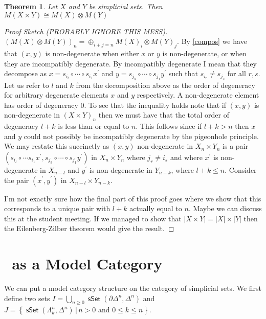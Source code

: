 \documentclass{amsart}
\newcommand{\catname}[1]{{\sffamily\upshape{{#1}}}}
\newcommand{\sset}{\catname{sSet}}
\DeclareMathOperator{\msset}{\mathsf{sSet}}
\newtheorem{theorem}{Theorem}[subsection]
\theoremstyle{definition}
\begin{document}
\begin{theorem}
  Let $X$ and $Y$ be simplicial sets. Then
  $M(X\times Y)\cong M(X)\otimes M(Y)$
\end{theorem}
\begin{proof}[Proof Sketch (PROBABLY IGNORE THIS MESS)]
  $\left(M(X)\otimes M(Y)\right)_n = \oplus_{i+j=n} M(X)_i \otimes M(Y)_j$.
  By \ref{compos} we have that $(x,y)$ is non-degenerate when either $x$ or
  $y$ is non-degenerate, or when they are incompatibly degenerate. By incompatibly
  degenerate I mean that they decompose as
  $x=s_{i_l}\circ\cdots \circ s_{i_1} x^\prime$ and
  $y=s_{j_k}\circ \cdots \circ s_{j_1} y^\prime$ such that $s_{i_r}\neq s_{j_s}$
  for all $r,s$. Let us refer to $l$ and $k$ from the decomposition above
  as the order of degeneracy for
  arbitrary degenerate elements $x$ and $y$ respectively. A non-degenerate element
  has order of degeneracy 0. To see that the inequality
  holds note that if $(x,y)$ is non-degenerate in $(X\times Y)_n$ then we must have
  that the total order of degeneracy $l+k$ is less than or equal to $n$.
  This follows since if $l+k >n$ then $x$ and $y$ could not possibly be incompatibly degenerate
  by the pigeonhole principle. We may restate this succinctly as
  $(x,y)$ non-degenerate in $X_n\times Y_n$ is
  a pair $(s_{i_l}\circ \cdots s_{i_1} x^\prime, s_{j_k}\circ
  \cdots \circ s_{j_1}y^\prime)$ in $X_n\times Y_n$ where $j_r \neq i_s$ and where $x^\prime$ is
  non-degenerate in $X_{n-l}$ and $y^\prime$ is non-degenerate in $Y_{n-k}$, where $l+k\leq n$.
  Consider the pair $(x^\prime,y^\prime)$ in $X_{n-l}\times Y_{n-k}$.

  I'm not exactly sure how the final part of this proof goes where we show that this 
  corresponds to a unique pair with $l+k$ actually equal to $n$. Maybe we can
  discuss this at the student meeting. If we managed to show that
  $|X\times Y| = |X| \times |Y|$ then the Eilenberg-Zilber theorem \cite{EZ}
  would give the result.
\end{proof}

\section{\sset  \, as a Model Category}
We can put a model category structure on the category of simplicial sets.
We first define two sets $I= \bigcup_{n\geq 0}\msset (\partial \Delta^n, \Delta^n)$
and $J= \left\{ \msset (\Lambda^n_k, \Delta^n)\, \big| \, n>0
  \text{ and }0\leq k\leq n \right\}$.
\end{document}
